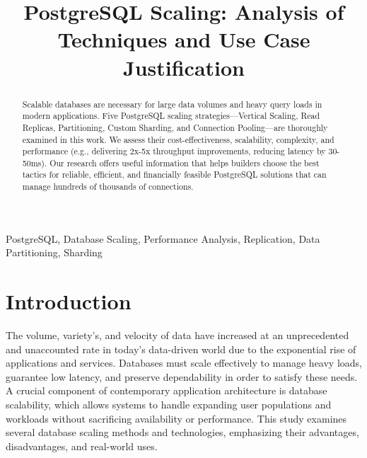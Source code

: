 \documentclass[conference]{IEEEtran}
\begin{document}
\title{PostgreSQL Scaling: Analysis of Techniques and Use Case Justification\\
}

\author{
\and
{}
}

\maketitle

\begin{abstract}
Scalable databases are necessary for large data volumes and heavy query loads in modern applications. Five PostgreSQL scaling strategies—Vertical Scaling, Read Replicas, Partitioning, Custom Sharding, and Connection Pooling—are thoroughly examined in this work. We assess their cost-effectiveness, scalability, complexity, and performance (e.g., delivering 2x-5x throughput improvements, reducing latency by 30-50ms). Our research offers useful information that helps builders choose the best tactics for reliable, efficient, and financially feasible PostgreSQL solutions that can manage hundreds of thousands of connections.
\end{abstract}

\begin{IEEEkeywords}
PostgreSQL, Database Scaling, Performance Analysis, Replication, Data Partitioning, Sharding
\end{IEEEkeywords}

\section{Introduction}
The volume, variety's, and velocity of data have increased at an unprecedented and unaccounted rate in today's data-driven world due to the exponential rise of applications and services.\cite{b4}\cite{b5} Databases must scale effectively to manage heavy loads, guarantee low latency, and preserve dependability in order to satisfy these needs. A crucial component of contemporary application architecture is database scalability, which allows systems to handle expanding user populations and workloads without sacrificing availability or performance. This study examines several database scaling methods and technologies, emphasizing their advantages, disadvantages, and real-world uses.
\end{document}
